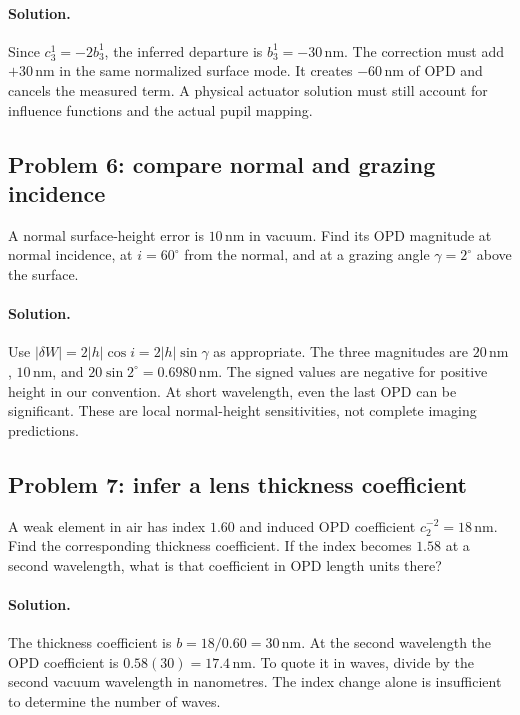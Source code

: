\paragraph{Solution.}
Since $c_3^1=-2b_3^1$, the inferred departure is
$b_3^1=-30\,\mathrm{nm}$. The correction must add
$+30\,\mathrm{nm}$ in the same normalized surface mode. It creates
$-60\,\mathrm{nm}$ of OPD and cancels the measured term. A physical
actuator solution must still account for influence functions and the
actual pupil mapping.

\subsection*{Problem 6: compare normal and grazing incidence}
A normal surface-height error is $10\,\mathrm{nm}$ in vacuum.
Find its OPD magnitude at normal incidence, at $i=60^\circ$ from the
normal, and at a grazing angle $\gamma=2^\circ$ above the surface.

\paragraph{Solution.}
Use $|\delta W|=2|h|\cos i=2|h|\sin\gamma$ as appropriate.
The three magnitudes are $20\,\mathrm{nm}$, $10\,\mathrm{nm}$,
and $20\sin2^\circ=0.6980\,\mathrm{nm}$. The signed values are
negative for positive height in our convention. At short wavelength,
even the last OPD can be significant. These are local normal-height
sensitivities, not complete imaging predictions.

\subsection*{Problem 7: infer a lens thickness coefficient}
A weak element in air has index $1.60$ and induced OPD coefficient
$c_2^{-2}=18\,\mathrm{nm}$. Find the corresponding thickness
coefficient. If the index becomes $1.58$ at a second wavelength,
what is that coefficient in OPD length units there?

\paragraph{Solution.}
The thickness coefficient is $b=18/0.60=30\,\mathrm{nm}$.
At the second wavelength the OPD coefficient is
$0.58(30)=17.4\,\mathrm{nm}$. To quote it in waves, divide by the
second vacuum wavelength in nanometres. The index change alone is
insufficient to determine the number of waves.

